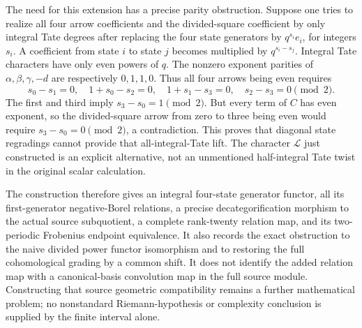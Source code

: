 The need for this extension has a precise parity obstruction. Suppose
one tries to realize all four arrow coefficients and the divided-square
coefficient by only integral Tate degrees after replacing the four
state generators by \(q^{s_i}e_i\), for integers \(s_i\). A coefficient
from state \(i\) to state \(j\) becomes multiplied by
\(q^{s_i-s_j}\). Integral Tate characters have only even powers of
\(q\). The nonzero exponent parities of \(\alpha,\beta,\gamma,-d\)
are respectively \(0,1,1,0\). Thus all four arrows being even requires
\[
 s_0-s_1=0,\quad 1+s_0-s_2=0,\quad
 1+s_1-s_3=0,\quad s_2-s_3=0\pmod2.
\]
The first and third imply \(s_3-s_0=1\pmod2\). But every term of
\(C\) has even exponent, so the divided-square arrow from zero to
three being even would require \(s_3-s_0=0\pmod2\), a contradiction.
This proves that diagonal state regradings cannot provide that
all-integral-Tate lift. The character \(\mathcal L\) just constructed
is an explicit alternative, not an unmentioned half-integral Tate
twist in the original scalar calculation.

The construction therefore gives an integral four-state generator
functor, all its first-generator negative-Borel relations, a precise
decategorification morphism to the actual source subquotient, a complete
rank-twenty relation map, and its two-periodic Frobenius endpoint
equivalence. It also records the exact obstruction to the naive divided
power functor isomorphism and to restoring the full cohomological
grading by a common shift. It does not identify the added relation map
with a canonical-basis convolution map in the full source module.
Constructing that source geometric compatibility remains a further
mathematical problem; no nonstandard Riemann-hypothesis or complexity
conclusion is supplied by the finite interval alone.
